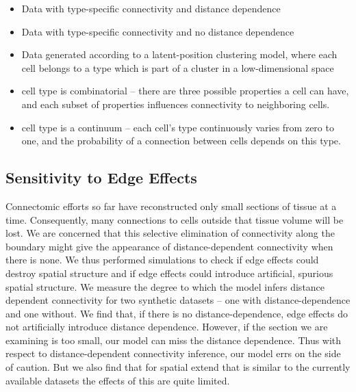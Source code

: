 \documentclass{article}
\begin{document}




\begin{itemize}
\item Data with type-specific connectivity and distance dependence
\item Data with type-specific connectivity and no distance dependence
\item Data generated according to a latent-position clustering model,
  where each cell belongs to a type which is part of a cluster in a
  low-dimensional space 
\item cell type is combinatorial -- there are three possible
  properties a cell can have, and each subset of properties influences
  connectivity to neighboring cells. 
\item cell type is a continuum -- each cell's type continuously varies
  from zero to one, and the probability of a connection between cells
  depends on this type.
\end{itemize}


\subsection{Sensitivity to Edge Effects} 

Connectomic efforts so far have reconstructed only small sections of tissue at a time. Consequently, many connections to cells outside that tissue volume
will be lost. We are concerned that this selective elimination of connectivity along the boundary might give the appearance of distance-dependent connectivity when there is none. We thus performed simulations to check if edge effects
could destroy spatial structure and if edge effects could introduce
artificial, spurious spatial structure. We measure the degree to which the model infers distance dependent connectivity for two synthetic datasets -- one with distance-dependence and one without. We find that, if there is no distance-dependence, edge effects do not artificially introduce distance dependence. However, if the section we are examining is too small, our model can miss the distance dependence. Thus with respect to distance-dependent connectivity inference, our model errs on the side of caution. But we also find that for spatial extend that is similar to the currently available datasets the effects of this are quite limited.

\end{document}
